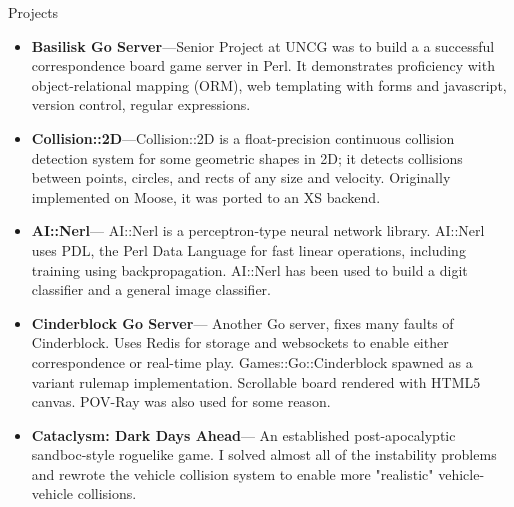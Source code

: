 \documentclass[11pt,oneside]{article}
\newenvironment{ressection}[1]{
	\vspace{2pt}
	{\fontfamily{phv}\selectfont\Large#1}
	\begin{itemize}
	\vspace{3pt}
}{
	\end{itemize}
}
\newcommand{\resitem}[1]{
	\vspace{-4pt}
	\item \begin{flushleft} #1 \end{flushleft}
}
\newcommand{\ressubitem}[1]{
	\vspace{-1pt}
	\item \begin{flushleft} #1 \end{flushleft}
}
\begin{document}





\newcommand{\resproj}[2]{
  \vspace{-5pt}
  \item
  \textbf{#1}---#2 \\
}

\begin{ressection}{Projects}

	\resproj{Basilisk Go Server}{Senior Project at UNCG was to build a a successful correspondence
         board game server in Perl. It demonstrates proficiency with object-relational mapping (ORM),
         web templating with forms and javascript, version control, regular expressions.}
	\resproj{Collision::2D}{Collision::2D is a float-precision continuous collision detection
      system for some geometric shapes in 2D; it detects collisions between
      points, circles, and rects of any size and velocity.
      Originally implemented on Moose, it was ported to an XS backend.}
	\resproj{AI::Nerl}{
      AI::Nerl is a perceptron-type neural network library. AI::Nerl uses PDL, the Perl Data
      Language for fast linear operations, including training using backpropagation.
      AI::Nerl has been used to build a digit classifier and a general image classifier.
      }
	\resproj{Cinderblock Go Server}{
      Another Go server, fixes many faults of Cinderblock. Uses Redis for storage and websockets
      to enable either correspondence or real-time play. Games::Go::Cinderblock spawned as a
      variant rulemap implementation. Scrollable board rendered with HTML5 canvas.
      POV-Ray was also used for some reason.
      }
	\resproj{Cataclysm: Dark Days Ahead}{
      An established post-apocalyptic sandboc-style roguelike game. I solved almost all of the
      instability problems and rewrote the vehicle collision system to enable more "realistic"
      vehicle-vehicle collisions.
      }
\end{ressection}
\end{document}
